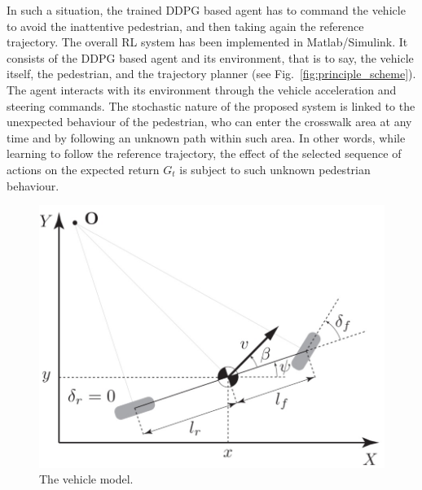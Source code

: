 In such a situation, the trained DDPG based agent has to command the vehicle to avoid the inattentive pedestrian, and then taking again the reference trajectory. The overall RL system has been implemented in Matlab/Simulink. It consists of the DDPG based agent and its environment, that is to say, the vehicle itself, the pedestrian, and the trajectory planner (see Fig.~\ref{fig:principle_scheme}). The agent interacts with its environment through the vehicle acceleration and steering commands. The stochastic nature of the proposed system is linked to the unexpected behaviour of the pedestrian, who can enter the crosswalk area at any time and by following an unknown path within such area. In other words, while learning to follow the reference trajectory, the effect of the selected sequence of actions on the expected return $G_t$ is subject to such unknown pedestrian behaviour.
\begin{figure}[ht]
\centering
\includegraphics[scale=0.5]{figure/Part2/Chapter5/Images/model_vehicle.jpg} 
\caption{The vehicle model.}
\label{fig:model_vehicle}
\end{figure}


